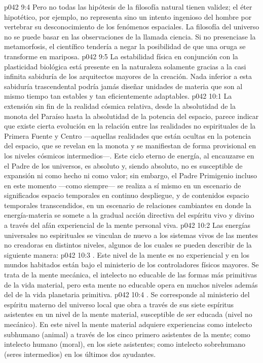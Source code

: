 \vs p042 9:4 Pero no todas las hipótesis de la filosofía natural tienen validez; el éter hipotético, por ejemplo, no representa sino un intento ingenioso del hombre por vertebrar su desconocimiento de los fenómenos espaciales. La filosofía del universo no se puede basar en las observaciones de la llamada ciencia. Si no presenciase la metamorfosis, el científico tendería a negar la posibilidad de que una oruga se transforme en mariposa.
\vs p042 9:5 La estabilidad física en conjunción con la plasticidad biológica está presente en la naturaleza solamente gracias a la casi infinita sabiduría de los arquitectos mayores de la creación. Nada inferior a esta sabiduría trascendental podría jamás diseñar unidades de materia que son al mismo tiempo tan estables y tan eficientemente adaptables.
\vs p042 10:1 La extensión sin fin de la realidad cósmica relativa, desde la absolutidad de la monota del Paraíso hasta la absolutidad de la potencia del espacio, parece indicar que existe cierta evolución en la relación entre las realidades no espirituales de la Primera Fuente y Centro ---aquellas realidades que están ocultas en la potencia del espacio, que se revelan en la monota y se manifiestan de forma provisional en los niveles cósmicos intermedios---. Este ciclo eterno de energía, al encauzarse en el Padre de los universos, es absoluto y, siendo absoluto, no es susceptible de expansión ni como hecho ni como valor; sin embargo, el Padre Primigenio incluso en este momento ---como siempre--- se realiza a sí mismo en un escenario de significados espacio temporales en continuo despliegue, y de contenidos espacio temporales transcendidos, en un escenario de relaciones cambiantes en donde la energía\hyp{}materia se somete a la gradual acción directiva del espíritu vivo y divino a través del afán experiencial de la mente personal viva.
\vs p042 10:2 Las energías universales no espirituales se vinculan de nuevo a los sistemas vivos de las mentes no creadoras en distintos niveles, algunos de los cuales se pueden describir de la siguiente manera:
\vs p042 10:3 . Este nivel de la mente es no experiencial y en los mundos habitados están bajo el ministerio de los controladores físicos mayores. Se trata de la mente mecánica, el intelecto no educable de las formas más primitivas de la vida material, pero esta mente no educable opera en muchos niveles además del de la vida planetaria primitiva.
\vs p042 10:4 . Se corresponde al ministerio del espíritu materno del universo local que obra a través de sus siete espíritus asistentes en un nivel de la mente material, susceptible de ser educada (nivel no mecánico). En este nivel la mente material adquiere experiencias como intelecto subhumano (animal) a través de los cinco primero asistentes de la mente; como intelecto humano (moral), en los siete asistentes; como intelecto sobrehumano (seres intermedios) en los últimos dos ayudantes.
